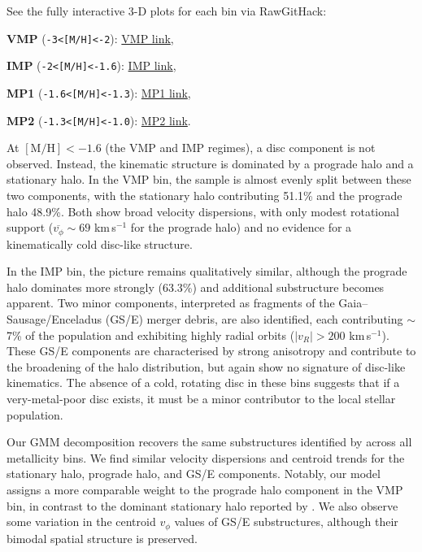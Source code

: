 \documentclass[a4paper,12pt]{article}
\begin{document}
See the fully interactive 3-D plots for each bin via RawGitHack:

\textbf{VMP} (\texttt{-3\textless[M/H]\textless-2}):
\href{\detokenize{https://raw.githack.com/raunaq-rai/Disentangling-the-Milky-Way-using-GMM/main/figures/VMP__-3%5BM_H%5D-2.html}}{VMP link},

\textbf{IMP} (\texttt{-2\textless[M/H]\textless-1.6}):
\href{\detokenize{https://raw.githack.com/raunaq-rai/Disentangling-the-Milky-Way-using-GMM/main/figures/IMP__-2%5BM_H%5D-1.6.html}}{IMP link},

\textbf{MP1} (\texttt{-1.6\textless[M/H]\textless-1.3}):
\href{\detokenize{https://raw.githack.com/raunaq-rai/Disentangling-the-Milky-Way-using-GMM/main/figures/MP1__-1.6%5BM_H%5D-1.3.html}}{MP1 link},

\textbf{MP2} (\texttt{-1.3\textless[M/H]\textless-1.0}):
\href{\detokenize{https://raw.githack.com/raunaq-rai/Disentangling-the-Milky-Way-using-GMM/main/figures/MP2__-1.3%5BM_H%5D-1.0.html}}{MP2 link}.


At $\mathrm{[M/H]} < -1.6$ (the VMP and IMP regimes), a disc component is not observed. Instead, the kinematic structure 
is dominated by a prograde halo and a stationary halo. In the VMP bin, the sample is almost evenly split between these 
two components, with the stationary halo contributing 51.1\% and the prograde halo 48.9\%. Both show broad velocity 
dispersions, with only modest rotational support ($\overline{v_\phi} \sim 69$ km\,s$^{-1}$ for the prograde halo) 
and no evidence for a kinematically cold disc-like structure.

In the IMP bin, the picture remains qualitatively similar, although the prograde halo dominates more strongly 
(63.3\%) and additional substructure becomes apparent. Two minor components, interpreted as fragments of the 
Gaia–Sausage/Enceladus (GS/E) merger debris, are also identified, each contributing $\sim$7\% of the population 
and exhibiting highly radial orbits ($|v_R| > 200$ km\,s$^{-1}$). These GS/E components are characterised by 
strong anisotropy and contribute to the broadening of the halo distribution, but again show no signature of 
disc-like kinematics. The absence of a cold, rotating disc in these bins suggests that if a very-metal-poor 
disc exists, it must be a minor contributor to the local stellar population.

Our GMM decomposition recovers the same substructures identified by \citet{zhang2024existencemetalpoordiscmilky} 
across all metallicity bins. We find similar velocity dispersions and centroid trends for the stationary halo, 
prograde halo, and GS/E components. Notably, our model assigns a more comparable weight to the 
prograde halo component in the VMP bin, in contrast to the dominant stationary 
halo reported by \citet{zhang2024existencemetalpoordiscmilky}. We also observe some variation 
in the centroid $v_\phi$ values of GS/E substructures, although their bimodal spatial structure is preserved. 
\end{document}
